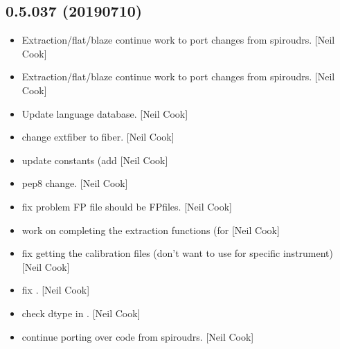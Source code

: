 \documentclass[a4paper,10pt,english]{report}
\begin{document}
\subsection{0.5.037 (2019\sphinxhyphen{}07\sphinxhyphen{}10)}
\label{\detokenize{misc/changelog:id122}}\begin{itemize}
\item {} 
Extraction/flat/blaze \sphinxhyphen{} continue work to port changes from spiroudrs.
{[}Neil Cook{]}

\item {} 
Extraction/flat/blaze \sphinxhyphen{} continue work to port changes from spiroudrs.
{[}Neil Cook{]}

\item {} 
Update language database. {[}Neil Cook{]}

\item {} 
 \sphinxhyphen{} change \textendash{}extfiber to \textendash{}fiber. {[}Neil Cook{]}

\item {} 
 \sphinxhyphen{} update constants (add  {[}Neil Cook{]}

\item {} 
 \sphinxhyphen{} pep8 change. {[}Neil Cook{]}

\item {} 
 \sphinxhyphen{} fix problem FP file should be FPfiles.
{[}Neil Cook{]}

\item {} 
 \sphinxhyphen{} work on completing the extraction functions (for
 {[}Neil Cook{]}

\item {} 
 \sphinxhyphen{} fix getting the calibration files (don’t want
to use  for specific instrument) {[}Neil Cook{]}

\item {} 
 \sphinxhyphen{} fix . {[}Neil Cook{]}

\item {} 
 \sphinxhyphen{} check dtype in . {[}Neil
Cook{]}

\item {} 
 \sphinxhyphen{} continue porting over code from spiroudrs. {[}Neil
Cook{]}


\end{itemize}
\end{document}
